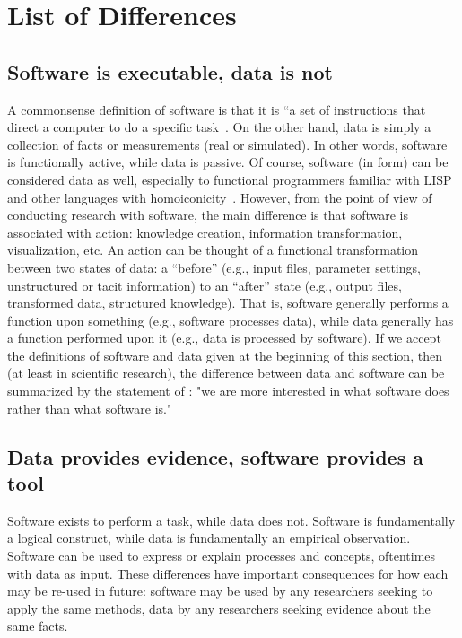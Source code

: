 \documentclass[fleqn,10pt]{wlpeerj} %
\begin{document}
\section*{List of Differences}
\label{sec:differences}

\subsection*{Software is executable, data is not}

A commonsense definition of software is that it is ``a set of instructions that direct a computer to do a specific task~\citep{Chun2004}. On the other hand, data is simply a collection of facts or measurements (real or simulated). In other words, software is functionally active, while data is passive. Of course, software (in form) can be considered data as well, especially to functional programmers familiar with LISP and other languages with homoiconicity~\citep{wiki-homoiconicity}. However, from the point of view of conducting research with software, the main difference is that software is associated with action: knowledge creation, information transformation, visualization, etc. An action can be thought of a functional transformation between two states of data: a ``before'' (e.g., input files, parameter settings, unstructured or tacit information) to an ``after'' state (e.g., output files, transformed data, structured knowledge). That is, software generally performs a function upon something (e.g., software processes data), while data generally has a function performed upon it (e.g., data is processed by software). If we accept the definitions of software and data given at the beginning of this section, then (at least in scientific research), the difference between data and software can be summarized by the statement of \cite{Matthews2010}: "we are more interested in what software does rather than what software is."

\subsection*{Data provides evidence, software provides a tool}

Software exists to perform a task, while data does not. Software is fundamentally a logical construct, while data is fundamentally an empirical observation. Software can be used to express or explain processes and concepts, oftentimes with data as input. These differences have important consequences for how each may be re-used in future: software may be used by any researchers seeking to apply the same methods, data by any researchers seeking evidence about the same facts.
\end{document}
